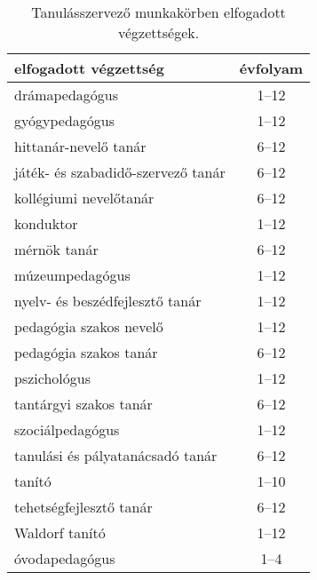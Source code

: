 \begin{table}[ht]
   \centering
    \begin{tabular}{l | c}
        \textbf{elfogadott végzettség}     & \textbf{évfolyam}
        \\ \hline \hline
        drámapedagógus                     & 1--12             \\ \hline
        gyógypedagógus                     & 1--12             \\ \hline
        hittanár-nevelő tanár              & 6--12             \\ \hline
        játék- és szabadidő-szervező tanár & 6--12             \\ \hline
        kollégiumi nevelőtanár             & 6--12             \\ \hline
        konduktor                          & 1--12             \\ \hline
        mérnök tanár                       & 6--12             \\ \hline
        múzeumpedagógus                    & 1--12             \\ \hline
        nyelv- és beszédfejlesztő tanár    & 1--12             \\ \hline
        pedagógia szakos nevelő            & 1--12             \\ \hline
        pedagógia szakos tanár             & 6--12             \\ \hline
        pszichológus                       & 1--12             \\ \hline
        tantárgyi szakos tanár             & 6--12             \\ \hline
        szociálpedagógus                   & 1--12             \\ \hline
        tanulási és pályatanácsadó tanár   & 6--12             \\ \hline
        tanító                             & 1--10             \\ \hline
        tehetségfejlesztő tanár            & 6--12             \\ \hline
        Waldorf tanító                     & 1--12             \\ \hline
        óvodapedagógus                     & 1--4              \\ \hline
    \end{tabular}
    \caption{Tanulásszervező munkakörben elfogadott végzettségek.}
    \label{tbl:vegzettsegek}
\end{table}

